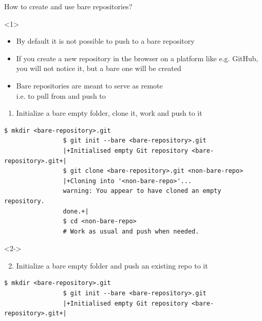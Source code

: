 \documentclass[usenames,svgnames,14pt]{beamer}
\newcommand{\then}{\raisebox{2pt}{$\;\drsh\;$}}
\begin{document}
\begin{frame}[fragile]{How to create and use bare repositories?}
    \setlength{\leftmarginii}{8mm}
    \vspace{-6mm}
    \begin{overlayarea}{\textwidth}{0.8\textheight}
        \begin{onlyenv}<1>
            \vspace{1mm}
            \begin{itemize}
                \item By default it is not possible to push to a bare repository
                \item If you create a new repository in the browser on a platform like e.g. GitHub, you will not notice it, but a bare one will be created
                \item \alert{Bare repositories are meant} to serve as remote\\ \then i.e. \alert{to pull from and push to}
            \end{itemize}
            \begin{enumerate}
                \item Initialize a bare empty folder, clone it, work and push to it
            \end{enumerate}
            \begin{lstlisting}[style=MyBash]
                $ mkdir <bare-repository>.git
                $ git init --bare <bare-repository>.git
                |+Initialised empty Git repository <bare-repository>.git+|
                $ git clone <bare-repository>.git <non-bare-repo>
                |+Cloning into '<non-bare-repo>'...
                warning: You appear to have cloned an empty repository.
                done.+|
                $ cd <non-bare-repo>
                # Work as usual and push when needed.
            \end{lstlisting}
        \end{onlyenv}
        \begin{onlyenv}<2->
            \begin{enumerate}
                \setcounter{enumi}{1}
                \item Initialize a bare empty folder and push an existing repo to it
            \end{enumerate}
            \begin{lstlisting}[style=MyBash]
                $ mkdir <bare-repository>.git
                $ git init --bare <bare-repository>.git
                |+Initialised empty Git repository <bare-repository>.git+|

\end{lstlisting}
\end{onlyenv}
\end{overlayarea}
\end{frame}
\end{document}

